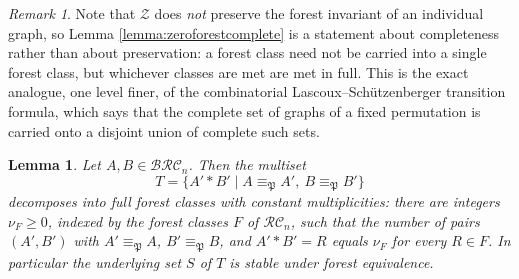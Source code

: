 \documentclass{amsart}
\newtheorem{lemma}{Lemma}[subsection]
\theoremstyle{definition}
\theoremstyle{remark}
\newtheorem*{remark}{Remark}
\numberwithin{equation}{subsection}
\newcommand{\zeromap}{\mathcal{Z}}
\newcommand{\BRC}{\mathcal{BRC}}
\newcommand{\RC}{\mathcal{RC}}
\newcommand{\forest}{\mathfrak{P}}
\begin{document}
\begin{remark}
Note that $\zeromap$ does \emph{not} preserve the forest invariant of an individual graph, so Lemma \ref{lemma:zeroforestcomplete} is a statement about completeness rather than about preservation: a forest class need not be carried into a single forest class, but whichever classes are met are met in full. This is the exact analogue, one level finer, of the combinatorial Lascoux--Sch\"utzenberger transition formula, which says that the complete set of graphs of a fixed permutation is carried onto a disjoint union of complete such sets.
\end{remark}

\begin{lemma}\label{lemma:foreststable}
Let $A,B\in\BRC_n$. Then the multiset
$$T=\{A'*B'\mid A\equiv_\forest A',\ B\equiv_\forest B'\}$$
decomposes into full forest classes with constant multiplicities: there are integers $\nu_F\geq 0$, indexed by the forest classes $F$ of $\RC_n$, such that the number of pairs $(A',B')$ with $A'\equiv_\forest A$, $B'\equiv_\forest B$, and $A'*B'=R$ equals $\nu_F$ for every $R\in F$. In particular the underlying set $S$ of $T$ is stable under forest equivalence.
\end{lemma}
\end{document}
